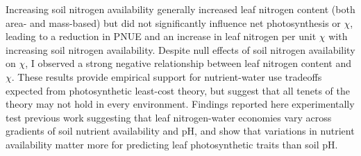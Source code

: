 Increasing soil nitrogen availability generally increased leaf nitrogen content (both area- and mass-based) but did not significantly influence net photosynthesis or $\chi$, leading to a reduction in PNUE and an increase in leaf nitrogen per unit $\chi$ with increasing soil nitrogen availability. Despite null effects of soil nitrogen availability on $\chi$, I observed a strong negative relationship between leaf nitrogen content and $\chi$. These results provide empirical support for nutrient-water use tradeoffs expected from photosynthetic least-cost theory, but suggest that all tenets of the theory may not hold in every environment. Findings reported here experimentally test previous work suggesting that leaf nitrogen-water economies vary across gradients of soil nutrient availability and pH, and show that variations in nutrient availability matter more for predicting leaf photosynthetic traits than soil pH.
